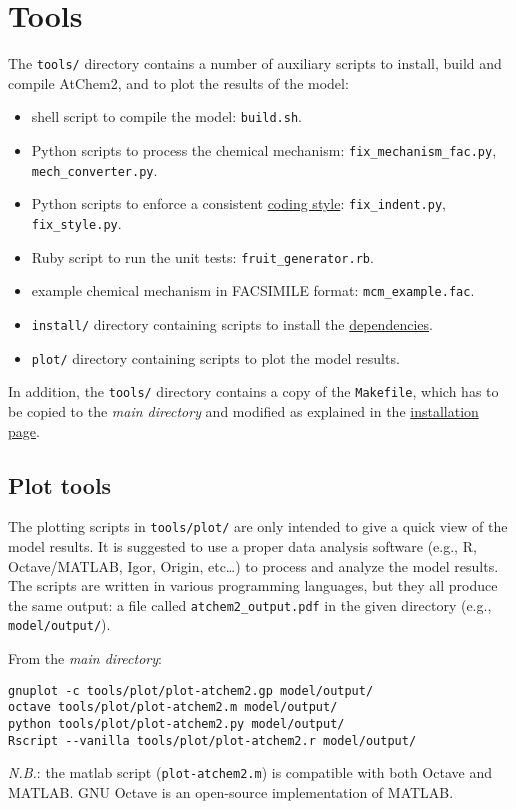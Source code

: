 \section{Tools} \label{sec:tools}

The \texttt{tools/} directory contains a number of auxiliary scripts
to install, build and compile AtChem2, and to plot the results of the
model:

\begin{itemize}
\item shell script to compile the model: \texttt{build.sh}.
\item Python scripts to process the chemical mechanism:
  \texttt{fix\_mechanism\_fac.py}, \texttt{mech\_converter.py}.
\item Python scripts to enforce a consistent
  \hyperref[sec:style]{coding style}: \texttt{fix\_indent.py},
  \texttt{fix\_style.py}.
\item Ruby script to run the unit tests: \texttt{fruit\_generator.rb}.
\item example chemical mechanism in FACSIMILE format:
  \texttt{mcm\_example.fac}.
\item \texttt{install/} directory containing scripts to install the
  \hyperref[sec:dependencies]{dependencies}.
\item \texttt{plot/} directory containing scripts to plot the model
  results.
\end{itemize}

In addition, the \texttt{tools/} directory contains a copy of the
\texttt{Makefile}, which has to be copied to the \emph{main directory}
and modified as explained in the \hyperref[sec:install]{installation
  page}.

\subsection{Plot tools} \label{subsec:plot-tools}

The plotting scripts in \texttt{tools/plot/} are only intended to give
a quick view of the model results. It is suggested to use a proper
data analysis software (e.g., R, Octave/MATLAB, Igor, Origin,
etc\ldots{}) to process and analyze the model results. The scripts are
written in various programming languages, but they all produce the
same output: a file called \texttt{atchem2\_output.pdf} in the given
directory (e.g., \texttt{model/output/}).

From the \emph{main directory}:

\begin{verbatim}
gnuplot -c tools/plot/plot-atchem2.gp model/output/
octave tools/plot/plot-atchem2.m model/output/
python tools/plot/plot-atchem2.py model/output/
Rscript --vanilla tools/plot/plot-atchem2.r model/output/
\end{verbatim}

\emph{N.B.}: the matlab script (\texttt{plot-atchem2.m}) is compatible
with both Octave and MATLAB. GNU Octave is an open-source
implementation of MATLAB.
